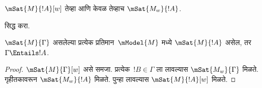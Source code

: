 \documentclass[../../../include/open-logic-section]{subfiles}
\begin{document}
\begin{prop}
  $\mSat{M}{!A}[w]$ तेव्हा आणि केवळ तेव्हाच
  $\mSat{M_w}{!A}$.
\end{prop}

\begin{prob}
   सिद्ध करा.
\end{prob}

\begin{prop}
  $\mSat{M}{\Gamma}$ असलेल्या प्रत्येक
  प्रतिमान~$\mModel{M}$ मध्ये
  $\mSat{M}{!A}$ असेल, तर
  $\Gamma \Entails !A$.
\end{prop}

\begin{proof}
  $\mSat{M}{\Gamma}[w]$ असे समजा.
  प्रत्येक~$!B \in \Gamma$ ला
   लावल्यास
  $\mSat{M_w}{\Gamma}$ मिळते. गृहीतकावरून
  $\mSat{M_w}{!A}$ मिळते.
  पुन्हा  लावल्यास
  $\mSat{M}{!A}[w]$ मिळते.
\end{proof}
\end{document}
